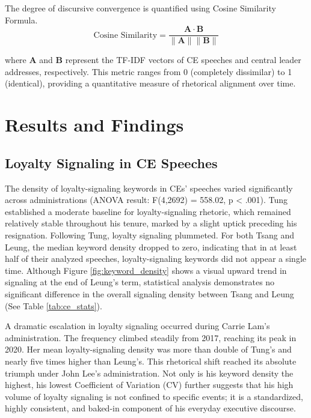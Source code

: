 \documentclass[9pt,a4paper,twocolumn,twoside]{rho-class/rho}
\begin{document}
        The degree of discursive convergence is quantified using Cosine Similarity Formula.
        \begin{equation}
            \text{Cosine Similarity} = \frac{\mathbf{A} \cdot \mathbf{B}}{\|\mathbf{A}\| \|\mathbf{B}\|}
        \end{equation}
       
        where $\mathbf{A}$ and $\mathbf{B}$ represent the TF-IDF vectors of CE speeches and central leader addresses, respectively. This metric ranges from 0 (completely dissimilar) to 1 (identical), providing a quantitative 
        measure of rhetorical alignment over time.
        

\section{Results and Findings}

    \subsection{Loyalty Signaling in CE Speeches}

        The density of loyalty-signaling keywords in CEs' speeches varied significantly across administrations (ANOVA result: F(4,2692) = 558.02, p < .001). Tung established a moderate 
        baseline for loyalty-signaling rhetoric, which remained relatively stable throughout his tenure, marked by a slight uptick preceding his resignation. Following Tung, loyalty signaling plummeted. For 
        both Tsang and Leung, the median keyword density dropped to zero, indicating that in at least half of their analyzed speeches, loyalty-signaling keywords did not appear a single time. Although Figure \ref{fig:keyword_density}
        shows a visual upward trend in signaling at the end of Leung's term, statistical analysis demonstrates no significant difference in the overall signaling density between Tsang and Leung (See Table \ref{tab:ce_stats}).
            
        A dramatic escalation in loyalty signaling occurred during Carrie Lam's administration. The frequency climbed steadily from 2017, reaching its peak in 2020. Her mean loyalty-signaling density was 
        more than double of Tung's and nearly five times higher than Leung's. This rhetorical shift reached its absolute triumph under John Lee's administration. Not only is his keyword density 
        the highest, his lowest Coefficient of Variation (CV) further suggests that his high volume of loyalty signaling is not confined to specific events; it is a standardized, highly consistent, 
        and baked-in component of his everyday executive discourse.
\end{document}
